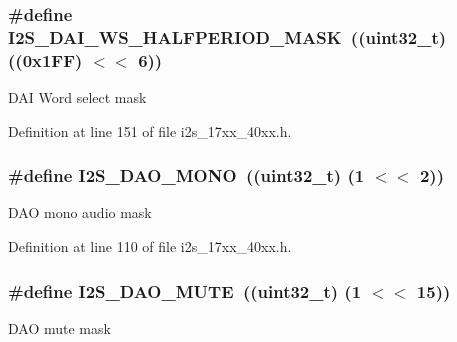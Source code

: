 \subsubsection[{\texorpdfstring{I2\+S\+\_\+\+D\+A\+I\+\_\+\+W\+S\+\_\+\+H\+A\+L\+F\+P\+E\+R\+I\+O\+D\+\_\+\+M\+A\+SK}{I2S_DAI_WS_HALFPERIOD_MASK}}]{\setlength{\rightskip}{0pt plus 5cm}\#define I2\+S\+\_\+\+D\+A\+I\+\_\+\+W\+S\+\_\+\+H\+A\+L\+F\+P\+E\+R\+I\+O\+D\+\_\+\+M\+A\+SK~((uint32\+\_\+t) ((0x1\+F\+F) $<$$<$ 6))}\hypertarget{group__I2S__17XX__40XX_gaa960b95856c5f78a0eaed42d383dd124}{}\label{group__I2S__17XX__40XX_gaa960b95856c5f78a0eaed42d383dd124}
D\+AI Word select mask 

Definition at line 151 of file i2s\+\_\+17xx\+\_\+40xx.\+h.

\subsubsection[{\texorpdfstring{I2\+S\+\_\+\+D\+A\+O\+\_\+\+M\+O\+NO}{I2S_DAO_MONO}}]{\setlength{\rightskip}{0pt plus 5cm}\#define I2\+S\+\_\+\+D\+A\+O\+\_\+\+M\+O\+NO~((uint32\+\_\+t) (1 $<$$<$ 2))}\hypertarget{group__I2S__17XX__40XX_gab32b25d6de6c9c964421ff08c1402e03}{}\label{group__I2S__17XX__40XX_gab32b25d6de6c9c964421ff08c1402e03}
D\+AO mono audio mask 

Definition at line 110 of file i2s\+\_\+17xx\+\_\+40xx.\+h.

\subsubsection[{\texorpdfstring{I2\+S\+\_\+\+D\+A\+O\+\_\+\+M\+U\+TE}{I2S_DAO_MUTE}}]{\setlength{\rightskip}{0pt plus 5cm}\#define I2\+S\+\_\+\+D\+A\+O\+\_\+\+M\+U\+TE~((uint32\+\_\+t) (1 $<$$<$ 15))}\hypertarget{group__I2S__17XX__40XX_ga78bd42c0693e2a68dcba79a4cc05b8d5}{}\label{group__I2S__17XX__40XX_ga78bd42c0693e2a68dcba79a4cc05b8d5}
D\+AO mute mask 

